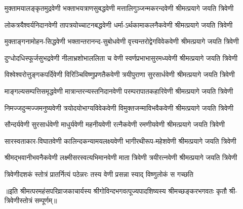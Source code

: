 
\twolineshloka
{मुक्तामयालङ्कृतमुद्रवेणी भक्ताभयत्राणसुबद्धवेणी}
{मत्तालिगुञ्जन्मकरन्दवेणी श्रीमत्प्रयागे जयति त्रिवेणी}%

\twolineshloka
{लोकत्रयैश्वर्यनिदानवेणी तापत्रयोच्चाटनबद्धवेणी}
{धर्मा-ऽर्थकामाकलनैकवेणी श्रीमत्प्रयागे जयति त्रिवेणी}%

\twolineshloka
{मुक्ताङ्गनामोहन-सिद्धवेणी भक्तान्तरानन्द-सुबोधवेणी}
{वृत्त्यन्तरोद्वेगविवेकवेणी श्रीमत्प्रयागे जयति त्रिवेणी}%

\twolineshloka
{दुग्धोदधिस्फूर्जसुभद्रवेणी नीलाभ्रशोभाललिता च वेणी}
{स्वर्णप्रभाभासुरमध्यवेणी श्रीमत्प्रयागे जयति त्रिवेणी}%

\twolineshloka
{विश्वेश्वरोत्तुङ्गकपर्दिवेणी विरिञ्चिविष्णुप्रणतैकवेणी}
{त्रयीपुराणा सुरसार्धवेणी श्रीमत्प्रयागे जयति त्रिवेणी}%

\twolineshloka
{माङ्गल्यसम्पत्तिसमृद्धवेणी मात्रान्तरन्यस्तनिदानवेणी}
{परम्परापातकहारिवेणी श्रीमत्प्रयागे जयति त्रिवेणी}%

\twolineshloka
{निमज्जदुन्मज्जमनुष्यवेणी त्रयोदयोभाग्यविवेकवेणी}
{विमुक्तजन्माविभवैकवेणी श्रीमत्प्रयागे जयति त्रिवेणी}%

\twolineshloka
{सौन्दर्यवेणी सुरसार्धवेणी माधुर्यवेणी महनीयवेणी}
{रत्नैकवेणी रमणीयवेणी श्रीमत्प्रयागे जयति त्रिवेणी}%

\twolineshloka
{सारस्वताकार-विघातवेणी कालिन्दकन्यामयलक्ष्यवेणी}
{भागीरथीरूप-महेशवेणी श्रीमत्प्रयागे जयति त्रिवेणी}%

\twolineshloka
{श्रीमद्भवानीभवनैकवेणी लक्ष्मीसरस्वत्यभिमानवेणी}
{माता त्रिवेणी त्रयीरत्नवेणी श्रीमत्प्रयागे जयति त्रिवेणी}%

\twolineshloka
{त्रिवेणीदशकं स्तोत्रं प्रातर्नित्यं पठेन्नरः}
{तस्य वेणी प्रसन्ना स्याद् विष्णुलोकं स गच्छति}%

॥इति श्रीमत्परमहंसपरिव्राजकाचार्यस्य श्रीगोविन्दभगवत्पूज्यपादशिष्यस्य 
श्रीमच्छङ्करभगवतः कृतौ श्री-त्रिवेणीस्तोत्रं सम्पूर्णम्॥